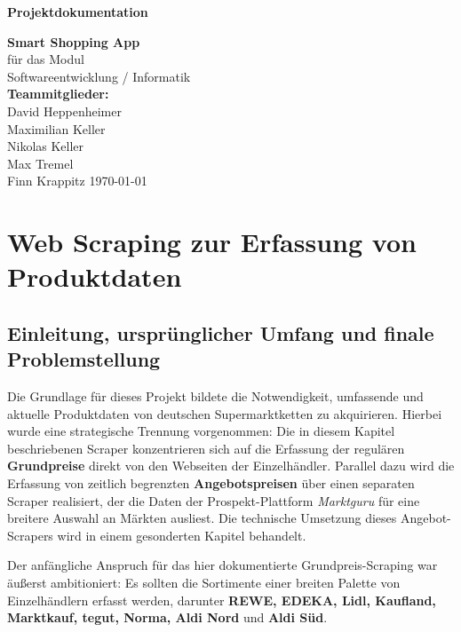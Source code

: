\documentclass[12pt, a4paper]{report} %
\begin{document}
\begin{titlepage}
    \centering
    \vspace*{4cm}
    {\LARGE\bfseries Projektdokumentation \par}
    \vspace{1.5cm}
    {\Large \textbf{Smart Shopping App} \\[3mm]}
    \vspace{1cm}
    {\large für das Modul\\
      Softwareentwicklung / Informatik\\}
    \vspace{1.5cm}
    {\large
      \textbf{Teammitglieder:}\\[5mm]
      David Heppenheimer\\
      Maximilian Keller\\
      Nikolas Keller\\
      Max Tremel\\
      Finn Krappitz
    }
    \vfill
    {\large \today}
\end{titlepage}

\tableofcontents
\cleardoublepage

\chapter{Web Scraping zur Erfassung von Produktdaten}
\label{chap:web_scraping}

\section{Einleitung, ursprünglicher Umfang und finale Problemstellung}
Die Grundlage für dieses Projekt bildete die Notwendigkeit, umfassende und aktuelle Produktdaten von deutschen Supermarktketten zu akquirieren. Hierbei wurde eine strategische Trennung vorgenommen: Die in diesem Kapitel beschriebenen Scraper konzentrieren sich auf die Erfassung der regulären \textbf{Grundpreise} direkt von den Webseiten der Einzelhändler. Parallel dazu wird die Erfassung von zeitlich begrenzten \textbf{Angebotspreisen} über einen separaten Scraper realisiert, der die Daten der Prospekt-Plattform \textit{Marktguru} für eine breitere Auswahl an Märkten ausliest. Die technische Umsetzung dieses Angebot-Scrapers wird in einem gesonderten Kapitel behandelt.

Der anfängliche Anspruch für das hier dokumentierte Grundpreis-Scraping war äußerst ambitioniert: Es sollten die Sortimente einer breiten Palette von Einzelhändlern erfasst werden, darunter \textbf{REWE, EDEKA, Lidl, Kaufland, Marktkauf, tegut, Norma, Aldi Nord} und \textbf{Aldi Süd}.
\end{document}
